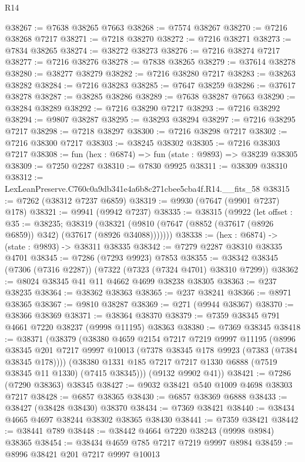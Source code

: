 \begin{lexlean}{R14}
\begin{coremodule}
@38267 := @7638 @38265 @7663
@38268 := @7574 @38267
@38270 := @7216 @38268 @7217
@38271 := @7218 @38270
@38272 := @7216 @38271
@38273 := @7834 @38265
@38274 := @38272 @38273
@38276 := @7216 @38274 @7217
@38277 := @7216 @38276
@38278 := @7838 @38265
@38279 := @37614 @38278
@38280 := @38277 @38279
@38282 := @7216 @38280 @7217
@38283 := @38263 @38282
@38284 := @7216 @38283
@38285 := @7647 @38259
@38286 := @37617 @38278
@38287 := @38285 @38286
@38289 := @7638 @38287 @7663
@38290 := @38284 @38289
@38292 := @7216 @38290 @7217
@38293 := @7216 @38292
@38294 := @9807 @38287
@38295 := @38293 @38294
@38297 := @7216 @38295 @7217
@38298 := @7218 @38297
@38300 := @7216 @38298 @7217
@38302 := @7216 @38300 @7217
@38303 := @38245 @38302
@38305 := @7216 @38303 @7217
@38308 := fun (hex : @6874) => fun (state : @9893) => @38239 @38305
@38309 := @7250 @2287
@38310 := @7830 @9925
@38311 := @38309 @38310
@38312 := LexLeanPreserve.C760c0a9db341e4a6b8c271cbee5cba4f.R14.__fits_58
@38315 := @7262 (@38312 @7237 @6859)
@38319 := @9930 (@7647 (@9901 @7237) @178)
@38321 := @9941 (@9942 @7237)
@38335 := @38315
    (@9922
      (let offset : @35 := @38235;
      @38319 (@38321 (@9810 (@7647 (@8852 (@37617 (@8926 @6859)) @342) (@37617 (@8926 @34088)))))))
@38338 := (hex : @6874) -> (state : @9893) -> @38311 @38335
@38342 := @7279 @2287 @38310 @38335 @4701
@38345 := @7286 (@7293 @9923) @7853
@38355 := @38342 @38345 (@7306 (@7316 @2287)) (@7322 (@7323 (@7324 @4701) @38310 @7299))
@38362 := @8024 @38345 @41 @11 @4662 @4699 @38238 @38305
@38363 := @237 @38235
@38364 := @38362 @38363
@38365 := @237 @38241
@38366 := @8971 @38365
@38367 := @9810 @38287
@38369 := @271 (@9944 @38367)
@38370 := @38366 @38369
@38371 := @38364 @38370
@38379 := @7359 @38345 @791 @4661 @7220 @38237 (@9998 @11195) @38363
@38380 := @7369 @38345
@38418 := @38371
    (@38379
      (@38380
        @4659
        @2154
        @7217
        @7219
        @9997
        @11195
        (@8996 @38345 @201 @7217 @9997 @10013 (@7378 @38345 @178 @9923 (@7383 (@7384 @38345 @178))))
        (@38380 @1331 @185 @7217 @7217 @1330 @6888 (@7519 @38345 @11 @1330) (@7415 @38345)))
      (@9132 @9902 @41))
@38421 := @7286 (@7290 @38363) @38345
@38427 := @9032 @38421 @540 @1009 @4698 @38303 @7217
@38428 := @6857 @38365
@38430 := @6857 @38369 @6888
@38433 := @38427 (@38428 @38430) @38370
@38434 := @7369 @38421
@38440 := @38434 @4665 @4697 @38244 @38302 @38365 @38430
@38441 := @7359 @38421
@38442 := @38441 @789
@38448 := @38442 @4664 @7220 @38243 (@9998 @8984) @38365
@38454 := @38434 @4659 @785 @7217 @7219 @9997 @8984
@38459 := @8996 @38421 @201 @7217 @9997 @10013

\end{coremodule}
\end{lexlean}
